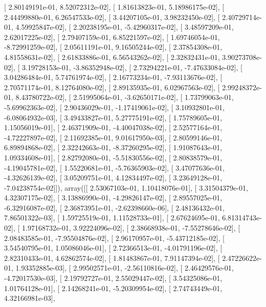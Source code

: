 \documentclass{article}
\begin{document}
       [ 2.80149191e-01,  8.52072312e-02],
       [ 1.81613823e-01,  5.18986175e-02],
       [ 2.44499880e-01,  6.26547533e-02],
       [ 3.44207105e-01,  3.98232450e-02],
       [ 2.40729714e-01,  4.59925847e-02],
       [ 2.20238195e-01, -5.42960317e-02],
       [ 3.48597209e-01,  2.62017225e-02],
       [ 2.79407159e-01,  6.85221597e-02],
       [ 1.69746054e-01, -8.72991259e-02],
       [ 2.05611191e-01,  9.16505244e-02],
       [ 2.37854308e-01,  4.81558631e-02],
       [ 2.61833886e-01,  6.56543262e-02],
       [ 2.32832431e-01,  3.90273708e-02],
       [ 3.19728153e-01, -3.86352948e-02],
       [ 2.73294221e-01, -7.47633084e-02],
       [ 3.04286484e-01,  5.74761974e-02],
       [ 2.16773234e-01, -7.93113676e-02],
       [ 2.70571174e-01,  8.12764080e-02],
       [ 2.89135935e-01,  6.02967563e-02],
       [ 2.99248372e-01,  8.43780722e-02],
       [ 2.51995064e-01, -3.62650171e-02],
       [ 1.73799063e-01, -5.69962363e-02],
       [ 2.90436029e-01, -1.17419061e-02],
       [ 3.10932801e-01, -6.08064932e-03],
       [ 3.49433827e-01,  5.27775191e-02],
       [ 1.75789605e-01,  1.15056019e-01],
       [ 2.46371909e-01, -4.40047038e-02],
       [ 2.52577164e-01, -4.72227897e-02],
       [ 2.11692385e-01,  9.01617950e-03],
       [ 2.80599146e-01,  6.89894868e-02],
       [ 2.32242663e-01, -8.37260295e-02],
       [ 1.91087643e-01,  1.09334608e-01],
       [ 2.82792080e-01, -5.51830556e-02],
       [ 2.80838579e-01, -4.19045781e-02],
       [ 1.55220681e-01, -5.76365903e-02],
       [ 3.47077636e-01, -4.32626139e-02],
       [ 3.05209751e-01,  4.12834497e-02],
       [ 3.23649128e-01, -7.04238754e-02]]), array([[ 2.53067103e-01,  1.10418076e-01],
       [ 3.31504379e-01,  4.32307175e-02],
       [ 3.13886990e-01, -4.29826147e-02],
       [ 2.89557025e-01, -6.32916087e-02],
       [ 2.36873951e-01, -2.62398660e-06],
       [ 2.48136432e-01,  7.86501322e-03],
       [ 1.59725519e-01,  1.11528733e-01],
       [ 2.67624695e-01,  6.81314743e-02],
       [ 1.97168732e-01,  3.92224096e-02],
       [ 2.38668938e-01, -7.55278646e-02],
       [ 2.08483585e-01, -7.95504876e-02],
       [ 2.96170957e-01, -5.43712185e-02],
       [ 3.54540795e-01,  1.05086046e-01],
       [ 2.72366513e-01, -4.01791196e-02],
       [ 2.82310433e-01,  4.62862574e-02],
       [ 1.81483867e-01,  7.91147394e-02],
       [ 2.47226622e-01,  1.93352885e-03],
       [ 2.99502571e-01, -2.56110816e-02],
       [ 2.46429576e-01, -4.72017530e-03],
       [ 2.19792727e-01,  2.55029447e-02],
       [ 3.54325086e-01,  1.01764128e-01],
       [ 2.14268241e-01, -5.20309954e-02],
       [ 2.74743449e-01,  4.32166981e-03],
\end{document}
